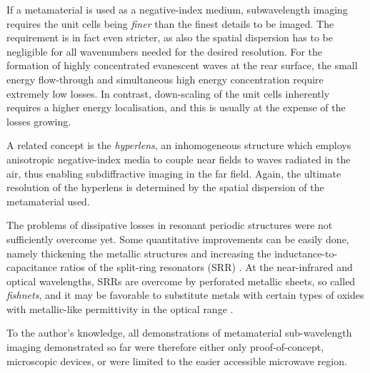 If a metamaterial is used as a negative-index medium, subwavelength imaging requires the unit cells being \textit{finer} than the finest details to be imaged. The requirement is in fact even stricter, as also the spatial dispersion has to be negligible for all wavenumbers needed for the desired resolution. %
For the formation of highly concentrated evanescent waves at the rear surface, the small energy flow-through and simultaneous high energy concentration require extremely low losses. In contrast, down-scaling of the unit cells inherently requires a higher energy localisation, and this is usually at the expense of the losses growing.

A related concept is the \textit{hyperlens}, an inhomogeneous structure which employs anisotropic negative-index media to couple near fields to waves radiated in the air, thus enabling subdiffractive imaging in the far field. Again, the ultimate resolution of the hyperlens is determined by the spatial dispersion of the metamaterial used.

The problems of dissipative losses in resonant periodic structures were not sufficiently overcome yet. Some quantitative improvements can be easily done, namely thickening the metallic structures and increasing the inductance-to-capacitance ratios of the split-ring resonators (SRR) \cite{zhou2008efficient}. At the near-infrared and optical wavelengths, SRRs are overcome by perforated metallic sheets, so called \textit{fishnets}, %
and it may be favorable to substitute metals with certain types of oxides with metallic-like permittivity in the optical range \cite{naik2011oxides}.

To the author's knowledge, all demonstrations of metamaterial sub-wavelength imaging demonstrated so far were therefore either only proof-of-concept, microscopic devices, or were limited to the easier accessible microwave region. %

